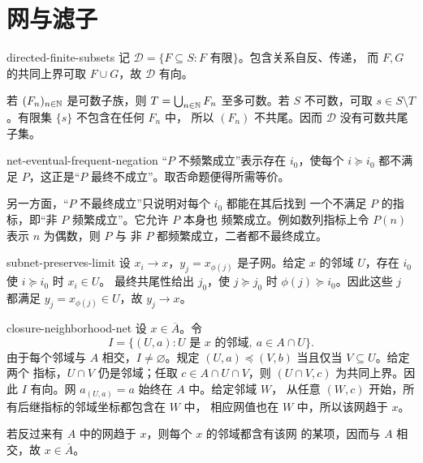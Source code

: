 \chapter{网与滤子}
\label{chap:nets-filters-solutions}

\begin{solution}{directed-finite-subsets}
记 \(\mathcal D=\{F\subseteq S:F\text{ 有限}\}\)。包含关系自反、传递，
而 \(F,G\) 的共同上界可取 \(F\cup G\)，故 \(\mathcal D\) 有向。

若 \((F_n)_{n\in\mathbb{N}}\) 是可数子族，则
\(T=\bigcup_{n\in\mathbb{N}}F_n\) 至多可数。若 \(S\) 不可数，可取
\(s\in S\setminus T\)。有限集 \(\{s\}\) 不包含在任何 \(F_n\) 中，
所以 \((F_n)\) 不共尾。因而 \(\mathcal D\) 没有可数共尾子集。
\end{solution}

\begin{solution}{net-eventual-frequent-negation}
“\(P\) 不频繁成立”表示存在 \(i_0\)，使每个 \(i\succcurlyeq i_0\)
都不满足 \(P\)，这正是“\(P\) 最终不成立”。取否命题便得所需等价。

另一方面，“\(P\) 不最终成立”只说明对每个 \(i_0\) 都能在其后找到
一个不满足 \(P\) 的指标，即“非 \(P\) 频繁成立”。它允许 \(P\) 本身也
频繁成立。例如数列指标上令 \(P(n)\) 表示 \(n\) 为偶数，则 \(P\) 与
非 \(P\) 都频繁成立，二者都不最终成立。
\end{solution}

\begin{solution}{subnet-preserves-limit}
设 \(x_i\to x\)，\(y_j=x_{\phi(j)}\) 是子网。给定 \(x\) 的邻域
\(U\)，存在 \(i_0\) 使 \(i\succcurlyeq i_0\) 时 \(x_i\in U\)。
最终共尾性给出 \(j_0\)，使 \(j\succcurlyeq j_0\) 时
\(\phi(j)\succcurlyeq i_0\)。因此这些 \(j\) 都满足
\(y_j=x_{\phi(j)}\in U\)，故 \(y_j\to x\)。
\end{solution}

\begin{solution}{closure-neighborhood-net}
设 \(x\in\overline A\)。令
\[
 I=\{(U,a):U\text{ 是 }x\text{ 的邻域},\ a\in A\cap U\}.
\]
由于每个邻域与 \(A\) 相交，\(I\ne\varnothing\)。规定
\((U,a)\preccurlyeq(V,b)\) 当且仅当 \(V\subseteq U\)。给定两个
指标，\(U\cap V\) 仍是邻域；任取
\(c\in A\cap U\cap V\)，则 \((U\cap V,c)\) 为共同上界。因此
\(I\) 有向。网 \(a_{(U,a)}=a\) 始终在 \(A\) 中。给定邻域 \(W\)，
从任意 \((W,c)\) 开始，所有后继指标的邻域坐标都包含在 \(W\) 中，
相应网值也在 \(W\) 中，所以该网趋于 \(x\)。

若反过来有 \(A\) 中的网趋于 \(x\)，则每个 \(x\) 的邻域都含有该网
的某项，因而与 \(A\) 相交，故 \(x\in\overline A\)。
\end{solution}

